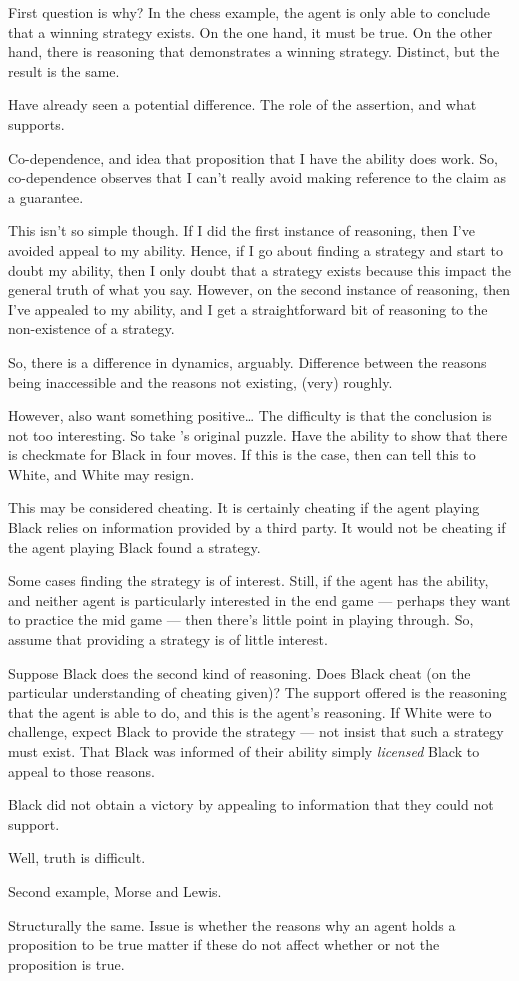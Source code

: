 \documentclass[10pt]{article}
\begin{document}
\begin{note}[Why]
  First question is why?
  In the chess example, the agent is only able to conclude that a winning strategy exists.
  On the one hand, it must be true.
  On the other hand, there is reasoning that demonstrates a winning strategy.
  Distinct, but the result is the same.

  Have already seen a potential difference.
  The role of the assertion, and what supports.

  Co-dependence, and idea that proposition that I have the ability does work.
  So, co-dependence observes that I can't really avoid making reference to the claim as a guarantee.

  This isn't so simple though.
  If I did the first instance of reasoning, then I've avoided appeal to my ability.
  Hence, if I go about finding a strategy and start to doubt my ability, then I only doubt that a strategy exists because this impact the general truth of what you say.
  However, on the second instance of reasoning, then I've appealed to my ability, and I get a straightforward bit of reasoning to the non-existence of a strategy.

  So, there is a difference in dynamics, arguably.
  Difference between the reasons being inaccessible and the reasons not existing, (very) roughly.

  However, also want something positive\dots
  The difficulty is that the conclusion is not too interesting.
  So take \citeauthor{Emms:2000aa}'s original puzzle.
  Have the ability to show that there is checkmate for Black in four moves.
  If this is the case, then can tell this to White, and White may resign.

  This may be considered cheating.
  It is certainly cheating if the agent playing Black relies on information provided by a third party.
  It would not be cheating if the agent playing Black found a strategy.

  Some cases finding the strategy is of interest.
  Still, if the agent has the ability, and neither agent is particularly interested in the end game --- perhaps they want to practice the mid game --- then there's little point in playing through.
  So, assume that providing a strategy is of little interest.

  Suppose Black does the second kind of reasoning.
  Does Black cheat (on the particular understanding of cheating given)?
  The support offered is the reasoning that the agent is able to do, and this is the agent's reasoning.
  If White were to challenge, expect Black to provide the strategy --- not insist that such a strategy must exist.
  That Black was informed of their ability simply \emph{licensed} Black to appeal to those reasons.

  Black did not obtain a victory by appealing to information that they could not support.

  Well, truth is difficult.

  Second example, Morse and Lewis.

  Structurally the same.
  Issue is whether the reasons why an agent holds a proposition to be true matter if these do not affect whether or not the proposition is true.
\end{note}
\end{document}
